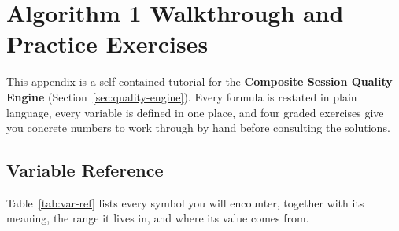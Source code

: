 \documentclass[11pt,a4paper]{article}
\begin{document}
\section{Algorithm 1 Walkthrough and Practice Exercises}
\label{app:walkthrough-quality}

This appendix is a self-contained tutorial for the
\textbf{Composite Session Quality Engine} (Section~\ref{sec:quality-engine}).
Every formula is restated in plain language, every variable is defined in one
place, and four graded exercises give you concrete numbers to work through by
hand before consulting the solutions.

\subsection{Variable Reference}
\label{app:var-ref}

Table~\ref{tab:var-ref} lists every symbol you will encounter, together with
its meaning, the range it lives in, and where its value comes from.
\end{document}
